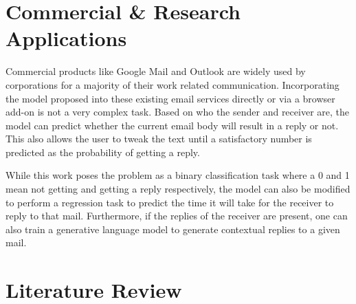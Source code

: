 


\section{Commercial \& Research Applications}

Commercial products like Google Mail and Outlook are widely used by corporations for a majority of their work related communication. Incorporating the model proposed into these existing email services directly or via a browser add-on is not a very complex task. Based on who the sender and receiver are, the model can predict whether the current email body will result in a reply or not. This also allows the user to tweak the text until a satisfactory number is predicted as the probability of getting a reply.  

While this work poses the problem as a binary classification task where a 0 and 1 mean not getting and getting a reply respectively, the model can also be modified to perform a regression task to predict the time it will take for the receiver to reply to that mail. Furthermore, if the replies of the receiver are present, one can also train a generative language model to generate contextual replies to a given mail.

\section{Literature Review}

